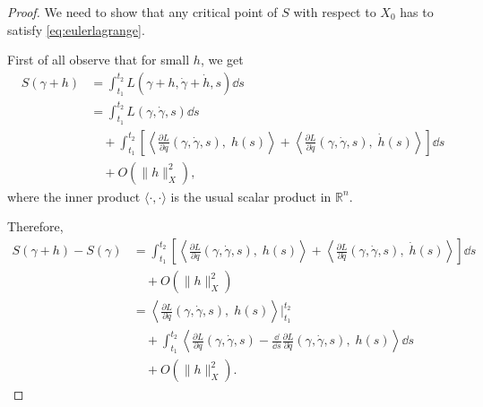 \documentclass[english,fontsize=11pt,paper=b5]{scrbook}
\theoremstyle{definition}
\begin{document}
  \begin{proof}
    We need to show that any critical point of $S$ with respect to $X_0$ has to satisfy \eqref{eq:eulerlagrange}.

    First of all observe that for small $h$, we get
    \begin{align}
      S(\gamma + h) &= \int_{t_1}^{t_2} L(\gamma + h, \dot \gamma + \dot h, s) \dd s \\
                    &= \int_{t_1}^{t_2} %
                    L(\gamma, \dot \gamma, s) \dd s \\
                    &\quad + \int_{t_1}^{t_2} \left[
                      \left\langle
                        \frac{\partial L}{\partial q}(\gamma, \dot \gamma, s),\;
                        h(s)
                      \right\rangle
                      + \left\langle
                        \frac{\partial L}{\partial \dot q}(\gamma, \dot \gamma, s),\;
                        \dot h(s)
                      \right\rangle
                    \right] \dd s \\
                    &\quad + O(\|h\|^2_X),
    \end{align}
    where the inner product $\langle\cdot,\cdot\rangle$ is the usual scalar product in $\mathbb{R}^n$.

    Therefore,
    \begin{align}
      S(\gamma+h) - S(\gamma) &= \int_{t_1}^{t_2} \left[
        \left\langle\frac{\partial L}{\partial q}(\gamma, \dot \gamma, s),\; h(s)\right\rangle
        + \left\langle\frac{\partial L}{\partial \dot q}(\gamma, \dot \gamma, s),\; \dot h(s)\right\rangle
      \right] \dd s\\
                              &\quad + O(\|h\|^2_X)\\
                              &= \left\langle\frac{\partial L}{\partial \dot q}(\gamma, \dot \gamma, s),\; h(s)\right\rangle \Big|_{t_1}^{t_2} \\
                              &\quad + \int_{t_1}^{t_2} \left\langle
                                \frac{\partial L}{\partial q}(\gamma, \dot \gamma, s)
                                - \frac{\dd}{\dd s}\frac{\partial L}{\partial \dot q}(\gamma, \dot \gamma, s)
                              ,\; h(s)\right\rangle \dd s\\
                              &\quad + O(\|h\|^2_X).
      \end{align}


\end{proof}
\end{document}
